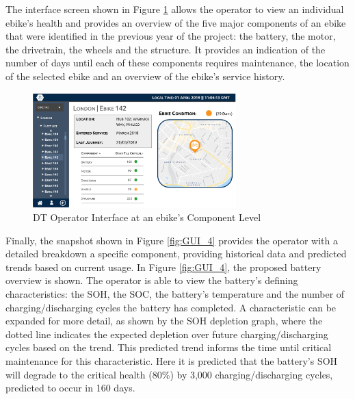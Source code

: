 \documentclass[a4paper, 10pt]{article}
\numberwithin{equation}{section}
\begin{document}

The interface screen shown in Figure \ref{fig:GUI_3} allows the operator to view an individual ebike's health and provides an overview of the five major components of an ebike that were identified in the previous year of the project: the battery, the motor, the drivetrain, the wheels and the structure. It provides an indication of the number of days until each of these components requires maintenance, the location of the selected ebike and an overview of the ebike's service history.

\begin{figure}[H]
\centering
\includegraphics[width=0.7\textwidth]{images/screen3.png}
\caption{DT Operator Interface at an ebike's Component Level}
\label{fig:GUI_3}
\end{figure}

Finally, the snapshot shown in Figure \ref{fig:GUI_4} provides the operator with a detailed breakdown a specific component, providing historical data and predicted trends based on current usage. In Figure \ref{fig:GUI_4}, the proposed battery overview is shown. The operator is able to view the battery's defining characteristics: the SOH, the SOC, the battery's temperature and the number of charging/discharging cycles the battery has completed. A characteristic can be expanded for more detail, as shown by the SOH depletion graph, where the dotted line indicates the expected depletion over future charging/discharging cycles based on the trend. This predicted trend informs the time until critical maintenance for this characteristic. Here it is predicted that the battery's SOH will degrade to the critical health (80\%) by 3,000 charging/discharging cycles, predicted to occur in 160 days.
\end{document}
